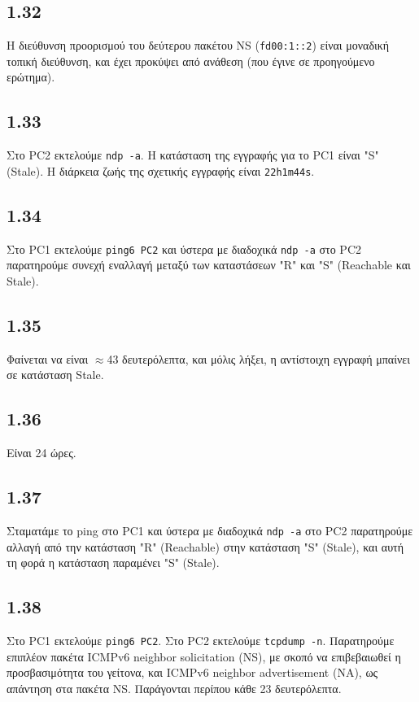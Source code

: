 \documentclass[a4paper, 12pt]{article}
\begin{document}
	\subsection*{1.32}
		Η διεύθυνση προορισμού του δεύτερου πακέτου NS (\verb|fd00:1::2|) είναι μοναδική τοπική διεύθυνση, και έχει προκύψει από ανάθεση (που έγινε σε προηγούμενο ερώτημα).

	\subsection*{1.33}
		Στο PC2 εκτελούμε \verb|ndp -a|. Η κατάσταση της εγγραφής για το PC1 είναι "S" (Stale). Η διάρκεια ζωής της σχετικής εγγραφής είναι \verb|22h1m44s|.

	\subsection*{1.34}
		Στο PC1 εκτελούμε \verb|ping6 PC2| και ύστερα με διαδοχικά \verb|ndp -a| στο PC2 παρατηρούμε συνεχή εναλλαγή μεταξύ των καταστάσεων "R" και "S" (Reachable και Stale).

	\subsection*{1.35}
		Φαίνεται να είναι $\approx$43 δευτερόλεπτα, και μόλις λήξει, η αντίστοιχη εγγραφή μπαίνει σε κατάσταση Stale.

	\subsection*{1.36}
		Είναι 24 ώρες.

	\subsection*{1.37}
		Σταματάμε το ping στο PC1 και ύστερα με διαδοχικά \verb|ndp -a| στο PC2 παρατηρούμε αλλαγή από την κατάσταση "R" (Reachable) στην κατάσταση "S" (Stale), και αυτή τη φορά η κατάσταση παραμένει "S" (Stale).

	\subsection*{1.38}
		Στο PC1 εκτελούμε \verb|ping6 PC2|. Στο PC2 εκτελούμε \verb|tcpdump -n|. Παρατηρούμε επιπλέον πακέτα ICMPv6 neighbor solicitation (NS), με σκοπό να επιβεβαιωθεί η προσβασιμότητα του γείτονα, και ICMPv6 neighbor advertisement (NA), ως απάντηση στα πακέτα NS. Παράγονται περίπου κάθε 23 δευτερόλεπτα.
\end{document}
